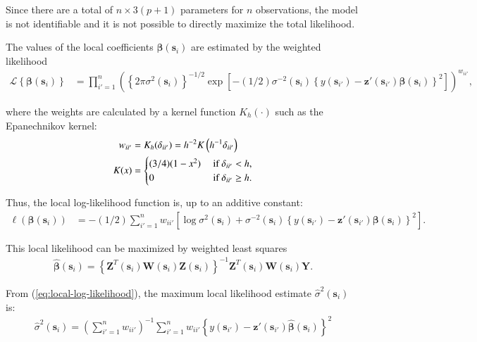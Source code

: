 \documentclass[authoryear, review, 11pt]{elsarticle}
\begin{document}
  Since there are a total of $n \times 3(p+1)$ parameters for $n$ observations, the model is not identifiable and it is not possible to directly maximize the total likelihood.
  
  The values of the local coefficients $\bm{\beta}(\bm{s}_i)$ are estimated by the weighted likelihood
  \begin{align}\label{eq:local-likelihood}
    \mathcal{L} \left\{ \bm{\beta}(\bm{s}_i) \right\} &= \prod_{i'=1}^n \left( \left\{ 2 \pi \sigma^2(\bm{s}_i)  \right\}^{-1/2}  \exp \left[- (1/2) \sigma^{-2}(\bm{s}_i)  \left\{ y(\bm{s}_{i'}) - \bm{z}'(\bm{s}_{i'}) \bm{\beta}(\bm{s}_i) \right\}^2 \right] \right) ^ {w_{ii'}},
  \end{align}
  
  where the weights are calculated by a kernel function $K_h(\cdot)$ such as the Epanechnikov kernel:
  \begin{align}\label{eq:epanechnikov}
    w_{ii'} &= K_h(\delta_{ii'}) = h^{-2} K\left( h^{-1} \delta_{ii'} \right) \notag \\
    K(x) &= \begin{cases} (3/4) (1-x^2) &\mbox{ if } \delta_{ii'} < h, \\ 0 &\mbox{ if } \delta_{ii'} \geq h. \end{cases}
  \end{align}
  
  Thus, the local log-likelihood function is, up to an additive constant: 
  \begin{align}\label{eq:local-log-likelihood}
    \ell\left(\bm{\beta}(\bm{s}_i)\right) &= -(1/2) \sum_{i'=1}^n w_{ii'} \left[ \log{\sigma^2(\bm{s}_i)}  + \sigma^{-2}(\bm{s}_i)  \left\{y(\bm{s}_{i'}) - \bm{z}'(\bm{s}_{i'}) \bm{\beta}(\bm{s}_i) \right\}^2 \right].
  \end{align}
  
  This local likelihood can be maximized by weighted least squares
  \begin{align}\label{eq:beta-hat}
    \hat{\bm{\beta}}(\bm{s}_i) = \left\{ \bm{Z}^T(\bm{s}_i) \bm{W}(\bm{s}_i) \bm{Z}(\bm{s}_i) \right\}^{-1} \bm{Z}^T(\bm{s}_i) \bm{W}(\bm{s}_i) \bm{Y}.
  \end{align}
	
  From (\ref{eq:local-log-likelihood}), the maximum local likelihood estimate $\hat{\sigma}^2(\bm{s}_i)$ is:	 
  \begin{align}
    \hat{\sigma}^2(\bm{s}_i) = \left(\sum \limits_{i'=1}^{n} w_{ii'} \right)^{-1} \sum \limits_{i'=1}^n w_{ii'} \left\{ y(\bm{s}_{i'}) - \bm{z}'(\bm{s}_{i'}) \hat{\bm{\beta}}(\bm{s}_i) \right\}^2
  \end{align}
  
\end{document}
